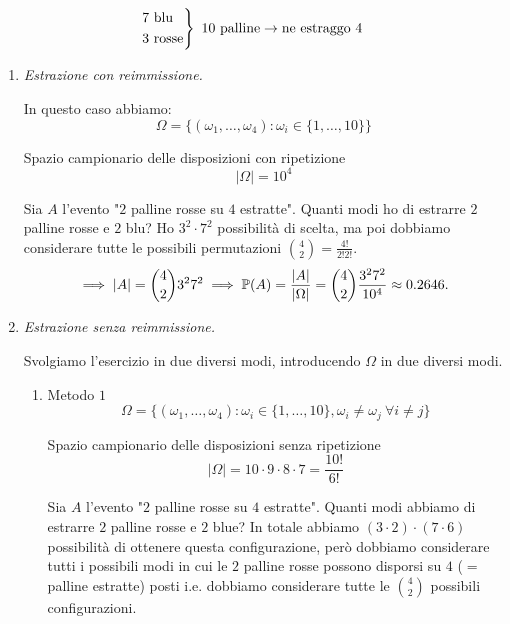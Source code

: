 \Soluzione

\begin{equation*}
\begin{drcases}
7\ \text{blu}\\
3\ \text{rosse}
\end{drcases} \ 10\ \text{palline}\rightarrow \text{ne estraggo} \ 4
\end{equation*}
\begin{enumerate}
\item \textit{Estrazione con reimmissione.}

In questo caso abbiamo:\begin{equation*}
\Omega =\{( \omega _{1} ,\dots ,\omega _{4}) :\omega _{i} \in \{1,\dots ,10\}\}
\end{equation*}

Spazio campionario delle disposizioni con ripetizione\begin{equation*}
| \Omega | =10^{4}
\end{equation*}

Sia $A$ l'evento "$2$ palline rosse su $4$ estratte". Quanti modi ho di estrarre $2$ palline rosse e $2$ blu? Ho $3^{2} \cdot 7^{2}$ possibilità di scelta, ma poi dobbiamo considerare tutte le possibili permutazioni $\binom{4}{2} =\frac{4!}{2!2!}$.\begin{equation*}
\implies | A| =\binom{4}{2} 3^{2} 7^{2}\implies \mathbb{P}( A) =\frac{| A| }{| \Omega | } =\binom{4}{2}\frac{3^{2} 7^{2}}{10^{4}} \approx 0.2646.
\end{equation*}
\item \textit{Estrazione senza reimmissione.}

Svolgiamo l'esercizio in due diversi modi, introducendo $\Omega $ in due diversi modi.
\begin{enumerate}
\item Metodo $1$\begin{equation*}
\Omega =\{( \omega _{1} ,\dots ,\omega _{4}) :\omega _{i} \in \{1,\dots ,10\} ,\omega _{i} \neq \omega _{j} \ \forall i\neq j\}
\end{equation*}

Spazio campionario delle disposizioni senza ripetizione\begin{equation*}
| \Omega | =10\cdot 9\cdot 8\cdot 7=\frac{10!}{6!}
\end{equation*}

Sia $A$ l'evento "$2$ palline rosse su $4$ estratte". Quanti modi abbiamo di estrarre $2$ palline rosse e $2$ blue? In totale abbiamo $( 3\cdot 2) \cdot ( 7\cdot 6)$ possibilità di ottenere questa configurazione, però dobbiamo considerare tutti i possibili modi in cui le $2$ palline rosse possono disporsi su $4$ ($=$palline estratte) posti i.e. dobbiamo considerare tutte le $\binom{4}{2}$ possibili configurazioni.


\end{enumerate}
\end{enumerate}
